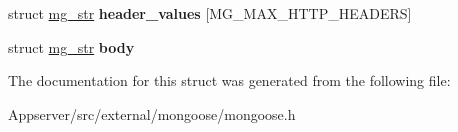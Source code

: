 \begin{DoxyCompactItemize}
\item 
struct \hyperlink{structmg__str}{mg\+\_\+str} {\bfseries header\+\_\+values} \mbox{[}M\+G\+\_\+\+M\+A\+X\+\_\+\+H\+T\+T\+P\+\_\+\+H\+E\+A\+D\+E\+RS\mbox{]}\hypertarget{structhttp__message_a95a0bfefd3a05bb3db52ce50a2ef71f4}{}\label{structhttp__message_a95a0bfefd3a05bb3db52ce50a2ef71f4}

\item 
struct \hyperlink{structmg__str}{mg\+\_\+str} {\bfseries body}\hypertarget{structhttp__message_ab2e0f6d6abe3879d9f85238ae9c10fd5}{}\label{structhttp__message_ab2e0f6d6abe3879d9f85238ae9c10fd5}

\end{DoxyCompactItemize}


The documentation for this struct was generated from the following file\+:\begin{DoxyCompactItemize}
\item 
Appserver/src/external/mongoose/mongoose.\+h\end{DoxyCompactItemize}
